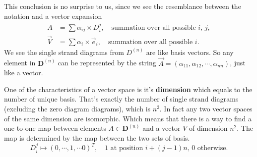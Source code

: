 \documentclass[10pt,a4paper]{article}
\newcommand{\DD}[2]{\boxed{D_{#1}^{#2}}}
\begin{document}
	This conclusion is no surprise to us, since we see the resemblance between the notation and a vector expansion
	\begin{equation}
	\begin{aligned}
	A &= \sum \alpha_{ij} \times \DD ij, \quad \text{summation over all possible } i,\,j,\\
	\vec V &= \sum \alpha_i \times \vec e_i , \quad \text{summation over all possible } i.
	\end{aligned}
	\end{equation} 
	We see the single strand diagrams from $D^{(n)}$ are like basis vectors. So any element in $\mathbf D^{(n)}$ can be represented by the string $\vec A = (\alpha_{11}, \alpha_{12},\cdots, \alpha_{nn})$, just like a vector. 
	
	One of the characteristics of a vector space is it's \textbf{dimension} which equals to the number of unique basis. That's exactly the number of single strand diagrams (excluding the zero diagram diagrams), which is $n^2$. In fact any two vector spaces of the same dimension are isomorphic. Which means that there is a way to find a one-to-one map between elements $A \in \mathbf D^{(n)}$ and a vector $V$ of dimension $n^2$. The map is determined by the map between the two sets of basis.
	\begin{equation}
	\DD ij \mapsto (0, \cdots,  1 , \cdots 0 )^T, \quad \text{$1$ at position $i+(j-1)n$, $0$ otherwise.}
	\end{equation}
	
\end{document}
